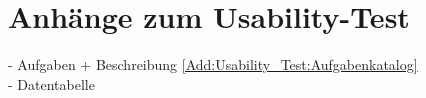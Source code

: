 \chapter{Anhänge zum Usability-Test}
\label{Add:Test}

- Aufgaben + Beschreibung \autoref{Add:Usability_Test:Aufgabenkatalog}\\
- Datentabelle\\


